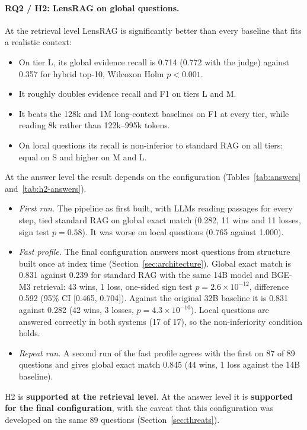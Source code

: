 \documentclass[11pt,letterpaper,oneside]{report}
\begin{document}
\paragraph{RQ2 / H2: LensRAG on global questions.}
At the retrieval level LensRAG is significantly better than every baseline
that fits a realistic context:
\begin{itemize}
  \item On tier L, its global evidence recall is 0.714 (0.772 with the
  judge) against 0.357 for hybrid top-10, Wilcoxon Holm $p<0.001$.
  \item It roughly doubles evidence recall and F1 on tiers L and M.
  \item It beats the 128k and 1M long-context baselines on F1 at every tier,
  while reading 8k rather than 122k--995k tokens.
  \item On local questions its recall is non-inferior to standard RAG on all
  tiers: equal on S and higher on M and L.
\end{itemize}
At the answer level the result depends on the configuration
(Tables~\ref{tab:answers} and~\ref{tab:h2-answers}).
\begin{itemize}
  \item \emph{First run.} The pipeline as first built, with LLMs reading
  passages for every step, tied standard RAG on global exact match (0.282,
  11 wins and 11 losses, sign test $p=0.58$). It was worse on local
  questions (0.765 against 1.000).
  \item \emph{Fast profile.} The final configuration answers most questions
  from structure built once at index time (Section~\ref{sec:architecture}).
  Global exact match is 0.831 against 0.239 for standard RAG with the same
  14B model and BGE-M3 retrieval: 43 wins, 1 loss, one-sided sign test
  $p=2.6\times10^{-12}$, difference 0.592 (95\% CI [0.465, 0.704]). Against
  the original 32B baseline it is 0.831 against 0.282 (42 wins, 3 losses,
  $p=4.3\times10^{-10}$). Local questions are answered correctly in both
  systems (17 of 17), so the non-inferiority condition holds.
  \item \emph{Repeat run.} A second run of the fast profile agrees with the
  first on 87 of 89 questions and gives global exact match 0.845 (44 wins,
  1 loss against the 14B baseline).
\end{itemize}
H2 is \textbf{supported at the retrieval level}. At the answer level it is
\textbf{supported for the final configuration}, with the caveat that this
configuration was developed on the same 89 questions
(Section~\ref{sec:threats}).
\end{document}
